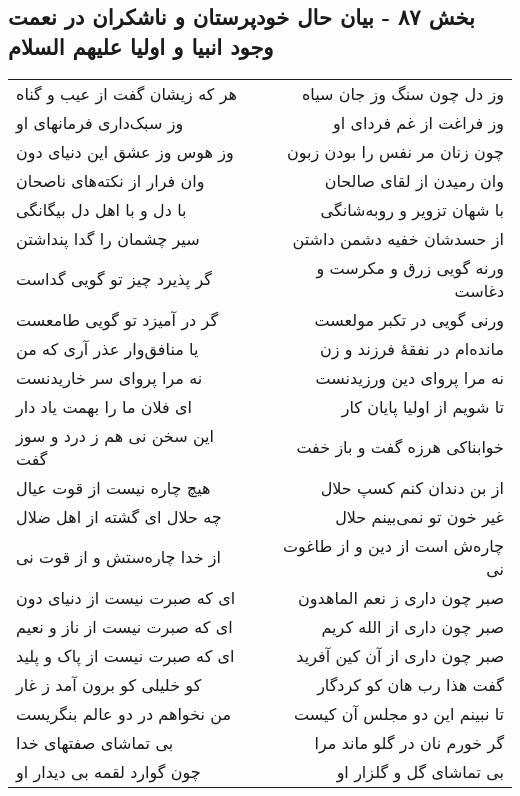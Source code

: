 \begin{center}
\section*{بخش ۸۷ - بیان حال خودپرستان و ناشکران در نعمت وجود انبیا و اولیا علیهم السلام}
\label{sec:sh087}
\begin{longtable}{l p{0.5cm} r}
هر که زیشان گفت از عیب و گناه
&&
وز دل چون سنگ وز جان سیاه
\\
وز سبک‌داری فرمانهای او
&&
وز فراغت از غم فردای او
\\
وز هوس وز عشق این دنیای دون
&&
چون زنان مر نفس را بودن زبون
\\
وان فرار از نکته‌های ناصحان
&&
وان رمیدن از لقای صالحان
\\
با دل و با اهل دل بیگانگی
&&
با شهان تزویر و روبه‌شانگی
\\
سیر چشمان را گدا پنداشتن
&&
از حسدشان خفیه دشمن داشتن
\\
گر پذیرد چیز تو گویی گداست
&&
ورنه گویی زرق و مکرست و دغاست
\\
گر در آمیزد تو گویی طامعست
&&
ورنی گویی در تکبر مولعست
\\
یا منافق‌وار عذر آری که من
&&
مانده‌ام در نفقهٔ فرزند و زن
\\
نه مرا پروای سر خاریدنست
&&
نه مرا پروای دین ورزیدنست
\\
ای فلان ما را بهمت یاد دار
&&
تا شویم از اولیا پایان کار
\\
این سخن نی هم ز درد و سوز گفت
&&
خوابناکی هرزه گفت و باز خفت
\\
هیچ چاره نیست از قوت عیال
&&
از بن دندان کنم کسپ حلال
\\
چه حلال ای گشته از اهل ضلال
&&
غیر خون تو نمی‌بینم حلال
\\
از خدا چاره‌ستش و از قوت نی
&&
چاره‌ش است از دین و از طاغوت نی
\\
ای که صبرت نیست از دنیای دون
&&
صبر چون داری ز نعم الماهدون
\\
ای که صبرت نیست از ناز و نعیم
&&
صبر چون داری از الله کریم
\\
ای که صبرت نیست از پاک و پلید
&&
صبر چون داری از آن کین آفرید
\\
کو خلیلی کو برون آمد ز غار
&&
گفت هذا رب هان کو کردگار
\\
من نخواهم در دو عالم بنگریست
&&
تا نبینم این دو مجلس آن کیست
\\
بی تماشای صفتهای خدا
&&
گر خورم نان در گلو ماند مرا
\\
چون گوارد لقمه بی دیدار او
&&
بی تماشای گل و گلزار او

\end{longtable}
\end{center}
